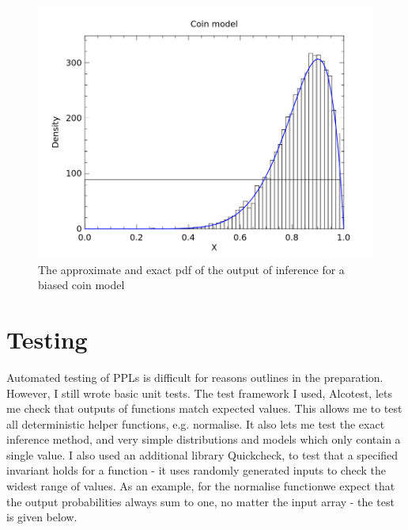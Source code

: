 \begin{figure}[!htb]
	\centering
																											
	\begin{minipage}{0.45\textwidth}
		\centering
		\inputminted{ocaml}{code_snippets/plotter.ml}	
	\end{minipage}
	\begin{minipage}{0.45\textwidth}
		\centering
		\includegraphics[width=\linewidth]{figs/coin_compare.png}
	\end{minipage}
																											
	\caption{The approximate and exact pdf of the output of inference for a biased coin model}
	\label{fig:vis-samples}
\end{figure}


\section{Testing}

Automated testing of PPLs is difficult for reasons outlines in the preparation. However, I still wrote basic unit tests. The test framework I used, Alcotest, lets me check that outputs of functions match expected values. This allows me to test all deterministic helper functions, e.g. normalise. It also lets me test the exact inference method, and very simple distributions and models which only contain a single value. I also used an additional library Quickcheck, to test that a specified invariant holds for a function - it uses randomly generated inputs to check the widest range of values. As an example, for the normalise functionwe expect that the output probabilities always sum to one, no matter the input array - the test is given below.

